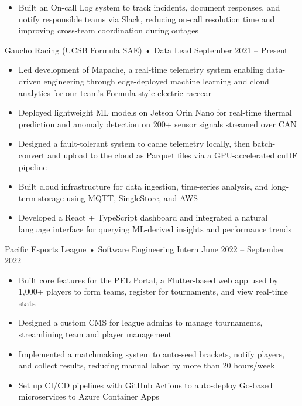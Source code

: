 \documentclass[9pt]{developercv} %
\begin{document}
\begin{entrylist}
{\begin{itemize}[noitemsep,topsep=0pt,parsep=0pt,partopsep=0pt, leftmargin=10pt]
            \item Built an On-call Log system to track incidents, document responses, and notify responsible teams via Slack, reducing on-call resolution time and improving cross-team coordination during outages
        \end{itemize}}
    \entry
		{}
		{Gaucho Racing (UCSB Formula SAE) • Data Lead}
		{September 2021 – Present}
		{\vspace{-8pt}
        \begin{itemize}[noitemsep,topsep=0pt,parsep=0pt,partopsep=0pt, leftmargin=10pt]
            \item Led development of Mapache, a real-time telemetry system enabling data-driven engineering through edge-deployed machine learning and cloud analytics for our team's Formula-style electric racecar
            \item Deployed lightweight ML models on Jetson Orin Nano for real-time thermal prediction and anomaly detection on 200+ sensor signals streamed over CAN
            \item Designed a fault-tolerant system to cache telemetry locally, then batch-convert and upload to the cloud as Parquet files via a GPU-accelerated cuDF pipeline
            \item Built cloud infrastructure for data ingestion, time-series analysis, and long-term storage using MQTT, SingleStore, and AWS
            \item Developed a React + TypeScript dashboard and integrated a natural language interface for querying ML-derived insights and performance trends
        \end{itemize}}
    \entry
        {}
        {Pacific Esports League • Software Engineering Intern}
        {June 2022 – September 2022}
        {\vspace{-8pt}
        \begin{itemize}[noitemsep,topsep=0pt,parsep=0pt,partopsep=0pt, leftmargin=10pt]
            \item Built core features for the PEL Portal, a Flutter-based web app used by 1,000+ players to form teams, register for tournaments, and view real-time stats
            \item Designed a custom CMS for league admins to manage tournaments, streamlining team and player management
            \item Implemented a matchmaking system to auto-seed brackets, notify players, and collect results, reducing manual labor by more than 20 hours/week
            \item Set up CI/CD pipelines with GitHub Actions to auto-deploy Go-based microservices to Azure Container Apps
        \end{itemize}}
\end{entrylist}
\vspace{-10pt}
\end{document}
